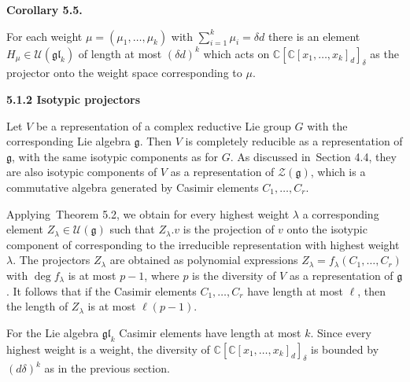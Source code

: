 \par\medskip\noindent\textbf{Corollary 5.5.}\par



For each weight $\mu=(\mu_{1},\dots,\mu_{k})$ with $\sum_{i=1}^{k}\mu_{i}=\delta d$ there is an element $H_{\mu}\in\mathcal{U}(\mathfrak{gl}_{k})$ of length at most $(\delta d)^{k}$ which acts on $\mathbb{C}[\mathbb{C}[x_{1},\ldots,x_{k}]_{d}]_{\delta}$ as the projector onto the weight space corresponding to $\mu$.







\par\medskip\noindent\textbf{5.1.2 Isotypic projectors}\par




Let $V$ be a representation of a complex reductive Lie group $G$ with the corresponding Lie algebra $\mathfrak{g}$.
Then $V$ is completely reducible as a representation of $\mathfrak{g}$, with the same isotypic components as for $G$.
As discussed in Section 4.4, they are also isotypic components of $V$ as a representation of $\mathcal{Z}(\mathfrak{g})$, which is a commutative algebra generated by Casimir elements $C_{1},\dots,C_{r}$.





Applying Theorem 5.2, we obtain for every highest weight $\lambda$ a corresponding element $Z_{\lambda}\in\mathcal{U}(\mathfrak{g})$ such that $Z_{\lambda}.v$ is the projection of $v$ onto the isotypic component of corresponding to the irreducible representation with highest weight $\lambda$.
The projectors $Z_{\lambda}$ are obtained as polynomial expressions $Z_{\lambda}=f_{\lambda}(C_{1},\dots,C_{r})$ with $\deg f_{\lambda}$ is at most $p-1$, where $p$ is the diversity of $V$ as a representation of $\mathfrak{g}$.
It follows that if the Casimir elements $C_{1},\dots,C_{r}$ have length at most $\ell$, then the length of $Z_{\lambda}$ is at most $\ell(p-1)$.





For the Lie algebra $\mathfrak{gl}_{k}$ Casimir elements have length at most $k$.
Since every highest weight is a weight, the diversity of $\mathbb{C}[\mathbb{C}[x_{1},\dots,x_{k}]_{d}]_{\delta}$ is bounded by $(d\delta)^{k}$ as in the previous section.





